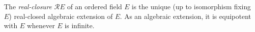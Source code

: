 The \emph{real-closure} $\mathcal{R}E$ of an ordered field $E$ is the unique (up to isomorphism fixing $E$) real-closed algebraic extension of $E$. As an algebraic extension, it is equipotent with $E$ whenever $E$ is infinite.